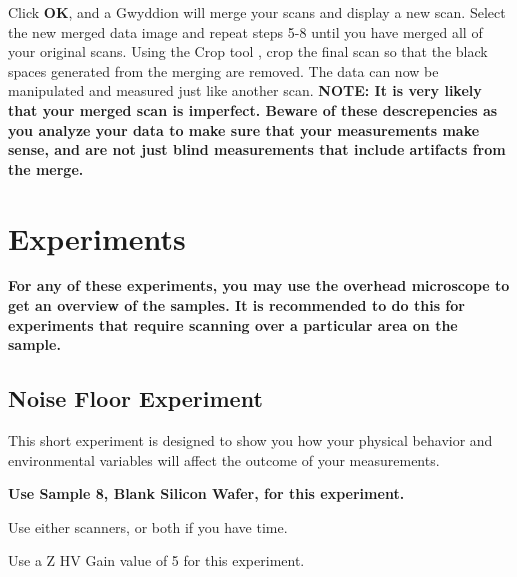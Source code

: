 \documentclass{../lab}
\begin{document}
\textbf{​}Click \textbf{OK}, and a Gwyddion will merge your scans and display a new scan.
\textbf{​}Select the new merged data image and repeat steps 5-8 until you have merged all of your original scans.
Using the Crop tool , crop the final scan so that the black spaces generated from the merging are removed.
The data can now be manipulated and measured just like another scan.
\textbf{NOTE: It is very likely that your merged scan is imperfect.  Beware of these descrepencies as you analyze your data to make sure that your measurements make sense, and are not just blind measurements that include artifacts from the merge.}\section{Experiments}

\textbf{For any of these experiments, you may use the overhead microscope to get an overview of the samples.  It is recommended to do this for experiments that require scanning over a particular area on the sample.}

\subsection{Noise Floor Experiment}

This short experiment is designed to show you how your physical behavior and environmental variables will affect the outcome of your measurements.

\textbf{Use Sample 8, Blank Silicon Wafer, for this experiment.}

Use either scanners, or both if you have time. \textbf{}

Use a Z HV Gain value of 5 for this experiment.
\end{document}
